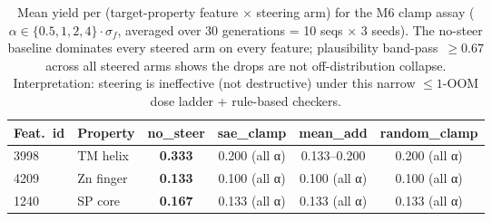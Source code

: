 \begin{table}[t]
\centering
\caption{Mean yield per (target-property feature $\times$ steering arm) for the M6 clamp assay ($\alpha \in \{0.5, 1, 2, 4\} \cdot \sigma_f$, averaged over 30 generations = 10 seqs $\times$ 3 seeds). The no-steer baseline dominates every steered arm on every feature; plausibility band-pass~$\geq 0.67$ across all steered arms shows the drops are not off-distribution collapse. Interpretation: steering is ineffective (not destructive) under this narrow $\leq 1$-OOM dose ladder + rule-based checkers.}
\label{tab:c5b_yield_matrix}
\begin{tabular}{ll | c | ccc}
\toprule
Feat.\ id & Property & no\_steer & sae\_clamp & mean\_add & random\_clamp \\
\midrule
3998 & TM helix & \textbf{0.333} & 0.200 (all α) & 0.133–0.200 & 0.200 (all α) \\
4209 & Zn finger & \textbf{0.133} & 0.100 (all α) & 0.100 (all α) & 0.100 (all α) \\
1240 & SP core & \textbf{0.167} & 0.133 (all α) & 0.133 (all α) & 0.133 (all α) \\

\bottomrule
\end{tabular}
\end{table}
